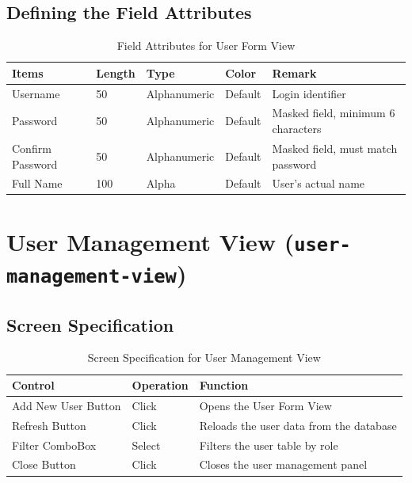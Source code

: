 \documentclass{article}
\begin{document}
\subsection{Defining the Field Attributes}
\begin{table}[h!]
\centering
\begin{tabularx}{\textwidth}{|l|l|l|l|X|}
\hline
\textbf{Items} & \textbf{Length} & \textbf{Type} & \textbf{Color} & \textbf{Remark} \\
\hline
Username & 50 & Alphanumeric & Default & Login identifier \\
\hline
Password & 50 & Alphanumeric & Default & Masked field, minimum 6 characters \\
\hline
Confirm Password & 50 & Alphanumeric & Default & Masked field, must match password \\
\hline
Full Name & 100 & Alpha & Default & User's actual name \\
\hline
\end{tabularx}
\caption{Field Attributes for User Form View}
\end{table}

\section{User Management View (\texttt{user-management-view})}
\subsection{Screen Specification}
\begin{table}[h!]
\centering
\begin{tabularx}{\textwidth}{|l|l|X|}
\hline
\textbf{Control} & \textbf{Operation} & \textbf{Function} \\
\hline
Add New User Button & Click & Opens the User Form View \\
\hline
Refresh Button & Click & Reloads the user data from the database \\
\hline
Filter ComboBox & Select & Filters the user table by role \\
\hline
Close Button & Click & Closes the user management panel \\
\hline
\end{tabularx}
\caption{Screen Specification for User Management View}
\end{table}
\end{document}
